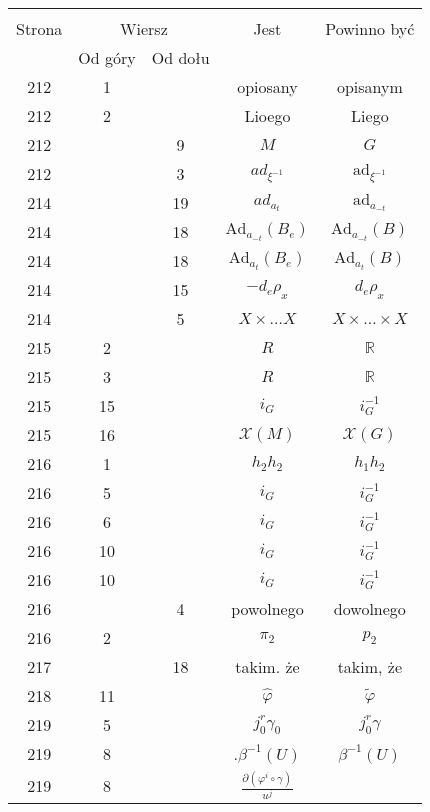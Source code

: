 \documentclass[a4paper,11pt]{article}
\newcommand{\fr}{\frac}
\newcommand{\mb}{\mathbb}
\newcommand{\mc}{\mathcal}
\newcommand{\mr}{\mathrm}
\newcommand{\pr}{\partial}
\newcommand{\ld}{\ldots}
\newcommand{\ti}{\times}
\newcommand{\ad}{\mr{ad}}
\newcommand{\Ad}{\mr{Ad}}
\newcommand{\be}{\beta}
\newcommand{\ga}{\gamma}
\newcommand{\vp}{\varphi}
\newcommand{\R}{\mb{R}}
\newcommand{\X}{\mc{X}}
\newcommand{\wt}{\widetilde}
\newcommand{\wh}{\widehat}
\begin{document}
\begin{center}
  \begin{tabular}{|c|c|c|c|c|}
    \hline
    & \multicolumn{2}{c|}{} & & \\
    Strona & \multicolumn{2}{c|}{Wiersz} & Jest
                              & Powinno być \\ \cline{2-3}
    & Od góry & Od dołu &  &  \\
    \hline
    212 &  1 & & opiosany & opisanym \\
    212 &  2 & & Lioego & Liego \\
    212 & &  9 & $M$ & $G$ \\
    212 & &  3 & $ad_{ \xi^{ -1 } }$ & $\ad_{ \xi^{ -1 } }$ \\
    214 & & 19 & $ad_{ a_{ t } }$ & $\ad_{ a_{ -t } }$ \\
    214 & & 18 & $\Ad_{ a_{ -t } }( B_{ e } )$ & $\Ad_{ a_{ -t } }( B )$ \\
    214 & & 18 & $\Ad_{ a_{ t } }( B_{ e } )$ & $\Ad_{ a_{ t } }( B )$ \\
    214 & & 15 & $-d_{ e }\rho_{ x }$ & $d_{ e }\rho_{ x }$ \\
    214 & &  5 & $X \ti \ld X$ & $X \ti \ld \ti X$ \\
    215 &  2 & & $R$ & $\R$ \\
    215 &  3 & & $R$ & $\R$ \\
    215 & 15 & & $i_{ G }$ & $i_{ G }^{ -1 }$ \\
    215 & 16 & & $\X( M )$ & $\X( G )$ \\
    216 &  1 & & $h_{ 2 }h_{ 2 }$ & $h_{ 1 }h_{ 2 }$ \\
    216 &  5 & & $i_{ G }$ & $i^{ -1 }_{ G }$ \\
    216 &  6 & & $i_{ G }$ & $i^{ -1 }_{ G }$ \\
    216 & 10 & & $i_{ G }$ & $i^{ -1 }_{ G }$ \\
    216 & 10 & & $i_{ G }$ & $i^{ -1 }_{ G }$ \\
    216 & &  4 & powolnego & dowolnego \\
    216 &  2 & & $\pi_{ 2 }$ & $p_{ 2 }$ \\
    217 & & 18 & takim. że & takim, że \\
    218 & 11 & & $\wh{ \vp }$ & $\wt{ \vp }$ \\
    219 &  5 & & $j^{ r }_{ 0 } \ga_{ 0 }$ & $j^{ r }_{ 0 } \ga$ \\
    219 &  8 & & $.\be^{ -1 }( U )$ & $\be^{ -1 }( U )$ \\
    219 &  8 & & $\fr{ \pr ( \vp^{ i } \circ \ga ) }{ u^{ j } }$

\end{tabular}
\end{center}
\end{document}
